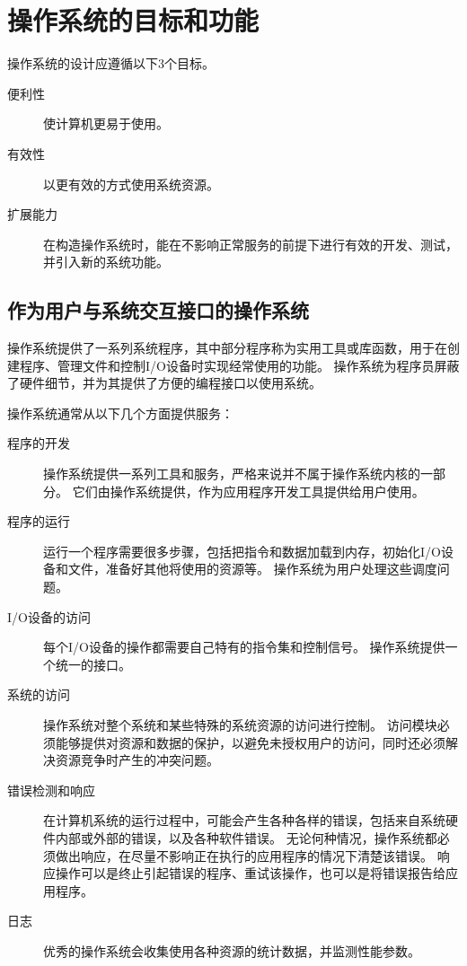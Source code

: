 
\section{操作系统的目标和功能}
{
    操作系统的设计应遵循以下3个目标。

    \begin{description}
        \item[便利性] 使计算机更易于使用。
        \item[有效性] 以更有效的方式使用系统资源。
        \item[扩展能力] 在构造操作系统时，能在不影响正常服务的前提下进行有效的开发、测试，并引入新的系统功能。
    \end{description}

    \subsection{作为用户与系统交互接口的操作系统}
    {
        操作系统提供了一系列系统程序，其中部分程序称为实用工具或库函数，用于在创建程序、管理文件和控制I/O设备时实现经常使用的功能。
        操作系统为程序员屏蔽了硬件细节，并为其提供了方便的编程接口以使用系统。

        操作系统通常从以下几个方面提供服务：

        \begin{description}
            \item[程序的开发]
            {
                操作系统提供一系列工具和服务，严格来说并不属于操作系统内核的一部分。
                它们由操作系统提供，作为应用程序开发工具提供给用户使用。
            }
            \item[程序的运行]
            {
                运行一个程序需要很多步骤，包括把指令和数据加载到内存，初始化I/O设备和文件，准备好其他将使用的资源等。
                操作系统为用户处理这些调度问题。
            }
            \item[I/O设备的访问]
            {
                每个I/O设备的操作都需要自己特有的指令集和控制信号。
                操作系统提供一个统一的接口。
            }
            \item[系统的访问]
            {
                操作系统对整个系统和某些特殊的系统资源的访问进行控制。
                访问模块必须能够提供对资源和数据的保护，以避免未授权用户的访问，同时还必须解决资源竞争时产生的冲突问题。
            }
            \item[错误检测和响应]
            {
                在计算机系统的运行过程中，可能会产生各种各样的错误，包括来自系统硬件内部或外部的错误，以及各种软件错误。
                无论何种情况，操作系统都必须做出响应，在尽量不影响正在执行的应用程序的情况下清楚该错误。
                响应操作可以是终止引起错误的程序、重试该操作，也可以是将错误报告给应用程序。
            }
            \item[日志]
            {
                优秀的操作系统会收集使用各种资源的统计数据，并监测性能参数。
            }
        \end{description}

}}

